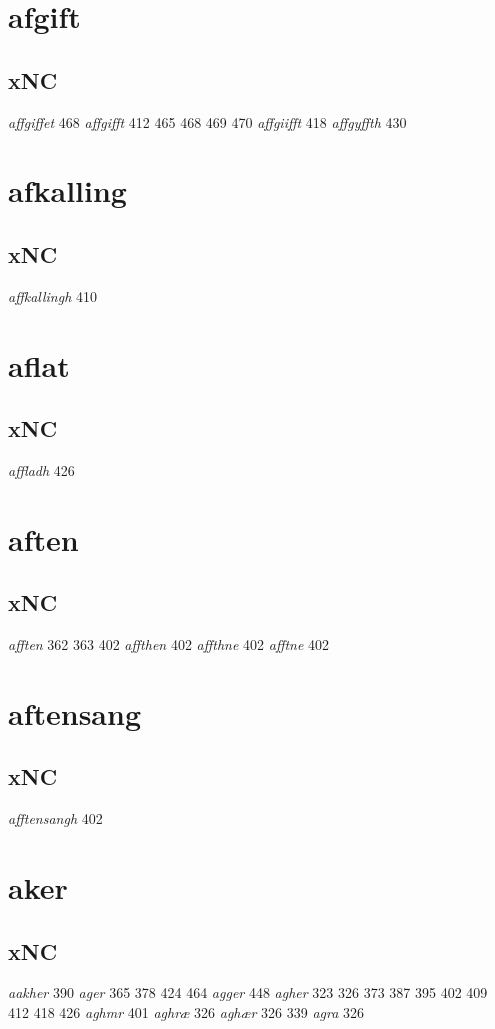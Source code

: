 \documentclass[a4paper,twocolumn]{article}
\begin{document}
\section{afgift}
\label{sec:org2937221}
\subsection{xNC}
\label{sec:org7650062}
\emph{affgiffet} 468 \emph{affgifft} 412 465 468 469 470 \emph{affgiifft} 418 \emph{affgyffth} 430 
\section{afkalling}
\label{sec:orgc1e2ca8}
\subsection{xNC}
\label{sec:orgbd9c887}
\emph{affkallingh} 410 
\section{aflat}
\label{sec:org29035a8}
\subsection{xNC}
\label{sec:org835cdba}
\emph{affladh} 426 
\section{aften}
\label{sec:orgc2a6c30}
\subsection{xNC}
\label{sec:orgf75d14c}
\emph{afften} 362 363 402 \emph{affthen} 402 \emph{affthne} 402 \emph{afftne} 402 
\section{aftensang}
\label{sec:org5426032}
\subsection{xNC}
\label{sec:org3a6e839}
\emph{afftensangh} 402 
\section{aker}
\label{sec:org6d7016e}
\subsection{xNC}
\label{sec:orgaba98ba}
\emph{aakher} 390 \emph{ager} 365 378 424 464 \emph{agger} 448 \emph{agher} 323 326 373 387 395 402 409 412 418 426 \emph{aghmr} 401 \emph{aghræ} 326 \emph{aghær} 326 339 \emph{agra} 326 
\end{document}
